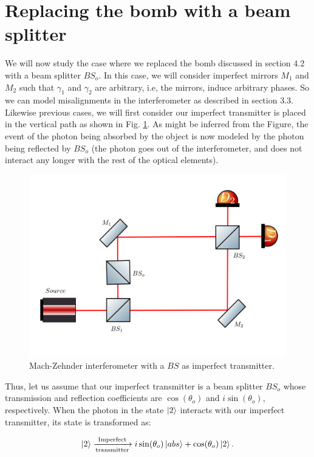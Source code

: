 \documentclass[12pt]{book}
\begin{document}
\section{Replacing the bomb with a beam splitter}

We will now study the case where we replaced the bomb discussed in section 4.2 with a beam splitter $BS_{o}$. In this case, we will consider imperfect mirrors $M_{1}$ and $M_{2}$ such that $\gamma_{1}$ and $\gamma_{2}$ are arbitrary, i.e, the mirrors, induce arbitrary phases. So we can model misalignments in the interferometer as described in section 3.3.  Likewise  previous cases, we will first consider our imperfect transmitter is placed in the vertical path as shown in Fig. \ref{bs vertical}. As might be inferred from the Figure, the event of the photon being absorbed by the object is now modeled by the photon being reflected by $BS_{o}$ (the photon goes out of the interferometer, and does not interact any longer with the rest of the optical elements).



\begin{figure}[t!]
\centering
\includegraphics[width=\linewidth,height=7.5 cm]{images/machzenhderbs.png}
\caption{Mach-Zehnder interferometer with a $BS$ as imperfect transmitter.}
\label{bs vertical}
\end{figure}

Thus, let us assume that our imperfect transmitter is a beam splitter $BS_{o}$ whose transmission and reflection coefficients are $\cos(\theta_{o})$ and $i\sin(\theta_{o})$, respectively. When the photon in the state $\ket{2}$ interacts with our imperfect transmitter, its state is transformed as:

\begin{align}
\ket{2}\xrightarrow[\text{transmitter}]{\text{Imperfect}}i\sin(\theta_{o}) \ket{abs} +\cos(\theta_{o}) \ket{2}.
\end{align}
\end{document}
